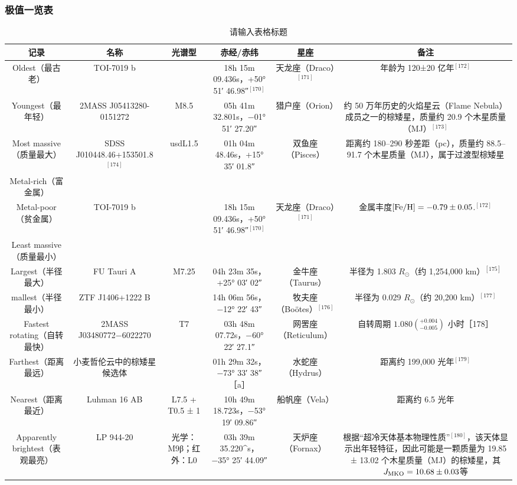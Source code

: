 \subsubsection{极值一览表}
\begin{table}[ht]
\centering
\caption{请输入表格标题}\label{tab_Brdw2}
\begin{tabular}{|c|c|c|c|c|c|}
\hline
\textbf{记录} & \textbf{名称} & \textbf{光谱型} & \textbf{赤经/赤纬} & \textbf{星座} &\textbf{备注} \\
\hline
Oldest（最古老） & TOI-7019 b  &  &  18h 15m 09.436s，+50° 51′ 46.98″$^{[170]}$ & 天龙座（Draco）$^{[171]}$ & 年龄为 120±20 亿年$^{[172]}$\\
\hline
Youngest（最年轻） & 2MASS J05413280-0151272  & M8.5  & 05h 41m 32.801s，−01° 51′ 27.20″ & 猎户座（Orion） & 约 50 万年历史的火焰星云（Flame Nebula）成员之一的棕矮星，质量约 20.9 个木星质量（MJ）$^{[173]}$\\
\hline
Most massive（质量最大） & SDSS J010448.46+153501.8 $^{[174]}$ &usdL1.5 & 01h 04m 48.46s，+15° 35′ 01.8″  & 双鱼座（Pisces） & 距离约 180–290 秒差距（pc），质量约 88.5–91.7 个木星质量（MJ），属于过渡型棕矮星\\
\hline
Metal-rich（富金属） &   &   &   &   & \\
\hline
Metal-poor（贫金属） & TOI-7019 b  &  & 18h 15m 09.436s，+50° 51′ 46.98″$^{[170]}$& 天龙座（Draco）$^{[171]}$ & 金属丰度$[{\rm Fe/H}] = -0.79 \pm 0.05$.$^{[172]}$\\
\hline
Least massive（质量最小）&   &   &   &   & \\
\hline
Largest（半径最大） & FU Tauri A  & M7.25 & 04h 23m 35s，+25° 03′ 02″  & 金牛座（Taurus） & 半径为 1.803 $R_\odot$（约 1,254,000 km）$^{[175]}$\\
\hline
mallest（半径最小） & ZTF J1406+1222 B &  & 14h 06m 56s，−12° 22′ 43″  & 牧夫座（Boötes）$^{[176]}$ & 半径为 0.029 $R_\odot$（约 20,200 km）$^{[177]}$\\
\hline
Fastest rotating（自转最快） & 2MASS J03480772−6022270  & T7 &03h 48m 07.72s，−60° 22′ 27.1″  & 网罟座（Reticulum） & 自转周期 $1.080(^{+0.004}_{-0.005})$ 小时［178］\\
\hline
Farthest（距离最远） & 小麦哲伦云中的棕矮星候选体 &   & 01h 29m 32s，−73° 33′ 38″［a］ & 水蛇座（Hydrus） & 距离约 199,000 光年$^{[179]}$\\
\hline
Nearest（距离最近） & Luhman 16 AB  & L7.5 + T0.5 ± 1 & 10h 49m 18.723s，−53° 19′ 09.86″ & 船帆座（Vela） & 距离约 6.5 光年\\
\hline
Apparently brightest（表观最亮） & LP 944-20 & 光学：M9β；红外：L0 & 03h 39m 35.220^s，−35° 25′ 44.09″& 天炉座（Fornax） & 根据“超冷天体基本物理性质”$^{[180]}$，该天体显示出年轻特征，因此可能是一颗质量为 19.85 ± 13.02 个木星质量（MJ）的棕矮星，其 $J_{\rm MKO} = 10.68 \pm 0.03$等\\

\end{tabular}
\end{table}
